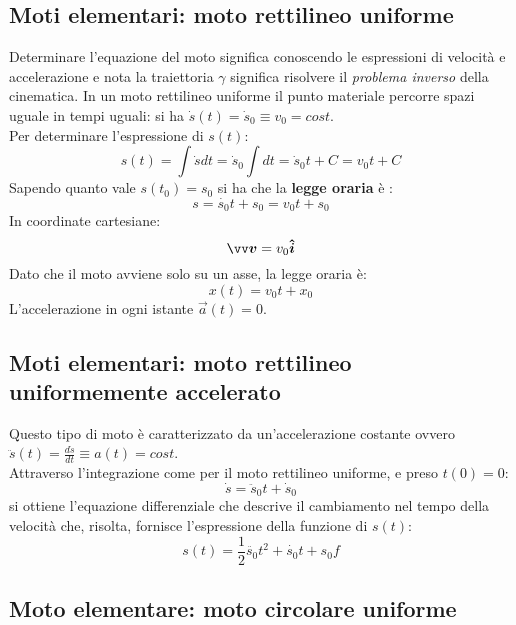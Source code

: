 \subsection*{Moti elementari: moto rettilineo uniforme}
Determinare  l'equazione del moto significa conoscendo le espressioni di  velocità e accelerazione e nota la traiettoria 
$\gamma $ significa risolvere il \emph{problema inverso} della cinematica.
In un moto rettilineo uniforme il punto materiale percorre spazi uguale in tempi uguali: si ha $\dot{s}(t) = \dot{s}_0
\equiv v_0 = cost$. \\
Per determinare l'espressione di $s(t)$:
\[
s(t) = \int \dot{s} dt = \dot{s}_0 \int dt = \dot{s}_0 t + C = v_0 t + C
\]
Sapendo quanto vale $s(t_0)= s_0$ si ha che la \textbf{legge oraria} è :
\[
   s = \dot{s_0}t + s_0 = v_0 t + s_0    
\]
In coordinate cartesiane:
\[
  \vec{v} = v_0 \v{i}     
\]
Dato che il moto avviene solo su un asse, la legge oraria è:
\[
  x(t) = v_0 t + x_0    
\]
L'accelerazione in ogni istante $\vec{a}(t) = 0$. 




\subsection*{Moti elementari: moto rettilineo uniformemente accelerato}

Questo tipo di moto è caratterizzato da un'accelerazione costante ovvero $\ddot{s}(t)
= \frac{d\dot{s}}{dt} \equiv a(t) = cost$. \\
Attraverso l'integrazione come per il moto rettilineo uniforme, e preso $t(0)= 0$:
\[
  \dot{s}= \ddot{s}_0t + \dot{s}_0    
\]
si ottiene l'equazione differenziale che descrive il cambiamento nel tempo della 
velocità che, risolta, fornisce l'espressione della funzione di $s(t)$:
\[
s(t) = \frac{1}{2}\ddot{s_0}t^2 + \dot{s_0}t + s_0f    
\]




\subsection*{Moto elementare: moto circolare uniforme}
\label{cinem: circ-unif}